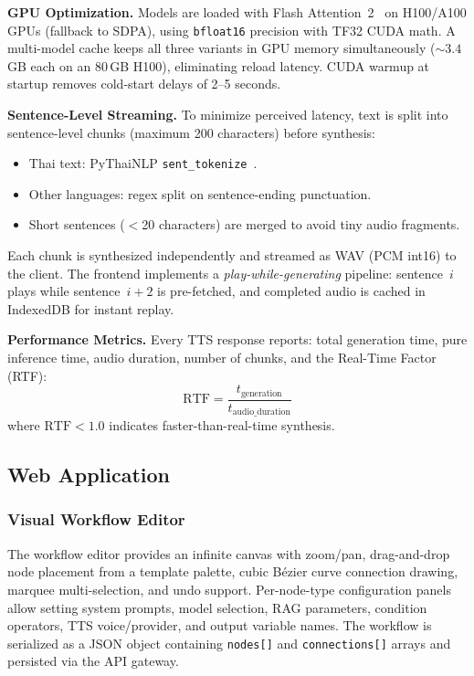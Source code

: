 \documentclass[10pt, a4paper, twocolumn]{article}
\begin{document}
\noindent\textbf{GPU Optimization.}
Models are loaded with Flash Attention~2~\cite{dao2022flashattention} on H100/A100 GPUs (fallback to SDPA), using \texttt{bfloat16} precision with TF32 CUDA math.
A multi-model cache keeps all three variants in GPU memory simultaneously (${\sim}3.4$\,GB each on an 80\,GB H100), eliminating reload latency.
CUDA warmup at startup removes cold-start delays of 2--5 seconds.

\noindent\textbf{Sentence-Level Streaming.}
To minimize perceived latency, text is split into sentence-level chunks (maximum 200 characters) before synthesis:
\begin{itemize}[nosep]
    \item Thai text: PyThaiNLP \texttt{sent\_tokenize}~\cite{pythainlp}.
    \item Other languages: regex split on sentence-ending punctuation.
    \item Short sentences ($<$20 characters) are merged to avoid tiny audio fragments.
\end{itemize}

\noindent Each chunk is synthesized independently and streamed as WAV (PCM int16) to the client.
The frontend implements a \textit{play-while-generating} pipeline: sentence~$i$ plays while sentence~$i{+}2$ is pre-fetched, and completed audio is cached in IndexedDB for instant replay.

\noindent\textbf{Performance Metrics.}
Every TTS response reports: total generation time, pure inference time, audio duration, number of chunks, and the Real-Time Factor (RTF):
\begin{equation}
    \text{RTF} = \frac{t_\text{generation}}{t_\text{audio\_duration}}
    \label{eq:rtf}
\end{equation}
\noindent where $\text{RTF} < 1.0$ indicates faster-than-real-time synthesis.

\subsection{Web Application}

\subsubsection{Visual Workflow Editor}
The workflow editor provides an infinite canvas with zoom/pan, drag-and-drop node placement from a template palette, cubic B\'{e}zier curve connection drawing, marquee multi-selection, and undo support.
Per-node-type configuration panels allow setting system prompts, model selection, RAG parameters, condition operators, TTS voice/provider, and output variable names.
The workflow is serialized as a JSON object containing \texttt{nodes[]} and \texttt{connections[]} arrays and persisted via the API gateway.
\end{document}
